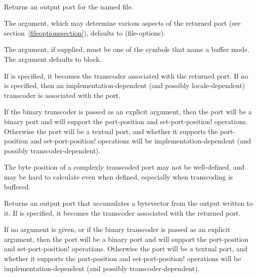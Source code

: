 \begin{entry}{%
\\
}

Returns an output port for the named file.

The  argument, which may determine
various aspects of the returned port (see section~\ref{fileoptionssection}),
defaults to {\cf (file-options)}.

The  argument, if supplied,
must be one of the symbols that name a buffer mode.
The  argument defaults to {\cf block}.

If  is specified, it becomes the transcoder associated
with the returned port.
If no  is specified, then an implementation-dependent
(and possibly locale-dependent) transcoder is associated with the port.

If the binary transcoder is passed as an explicit argument,
then the port will be a binary port and will support the
{\cf port-position} and {\cf set-port-position!}  operations.
Otherwise the port will be a textual port, and whether it supports
the {\cf port-position} and {\cf set-port-position!} operations
will be implementation-dependent (and possibly transcoder-dependent).

\begin{rationale}
  The byte position of a complexly transcoded port may not be
  well-defined, and may be hard to calculate even when defined,
  especially when transcoding is buffered.
\end{rationale}
\end{entry}   

\begin{entry}{%
}

Returns an output port that accumulates a bytevector from the
output written to it.  If  is specified, it becomes
the transcoder associated with the returned port.

If no  argument is given, or
if the binary transcoder is passed as an explicit argument,
then the port will be a binary port and will support the
{\cf port-position} and {\cf set-port-position!}  operations.
Otherwise the port will be a textual port, and whether it supports
the {\cf port-position} and {\cf set-port-position!} operations
will be implementation-dependent (and possibly transcoder-dependent).
\end{entry}

